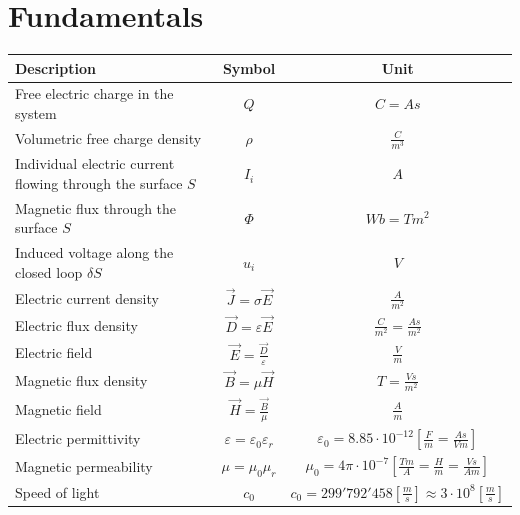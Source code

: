 \section{Fundamentals}

\begin{tabular}{|l|c|c|}
\hline \textbf{Description} & \textbf{Symbol} & \textbf{Unit} \\ 
\hline Free electric charge in the system & $Q$ & $C = As$ \\
\hline Volumetric free charge density & $\rho$ & $\frac{C}{m^3}$ \\
\hline Individual electric current flowing through the surface $S$ & $I_i$ & $A$ \\
\hline Magnetic flux through the surface $S$ & $\Phi$	& $Wb = Tm^2$\\
\hline Induced voltage along the closed loop $\delta S$ & $u_i$ & $V$ \\
\hline Electric current density & $\vec{J} = \sigma \vec{E}$ & $\frac{A}{m^2}$\\
\hline Electric flux density & $\vec{D} = \varepsilon \vec{E}$ & $\frac{C}{m^2} = \frac{As}{m^2}$\\
\hline Electric field & $\vec{E} = \frac{\vec{D}}{\varepsilon}$ & $\frac{V}{m}$\\
\hline Magnetic flux density & $\vec{B} = \mu \vec{H}$ & $T = \frac{Vs}{m^2}$\\
\hline Magnetic field & $\vec{H} = \frac{\vec{B}}{\mu}$ & $\frac{A}{m}$\\
\hline Electric permittivity & $\varepsilon = \varepsilon_0 \varepsilon_r$ & $\varepsilon_0 = 8.85 \cdot 10^{-12} \left[\frac{F}{m} = \frac{As}{Vm}\right]$\\
\hline Magnetic permeability & $\mu = \mu_0 \mu_r$ & $\mu_0 = 4\pi \cdot 10^{-7} \left[\frac{Tm}{A} = \frac{H}{m} = \frac{Vs}{Am}\right]$ \\
\hline Speed of light & $c_0$ & $c_0 = 299'792'458 [\frac{m}{s}] \approx 3\cdot 10^8 [\frac{m}{s}]$\\
\hline
\end{tabular} 

